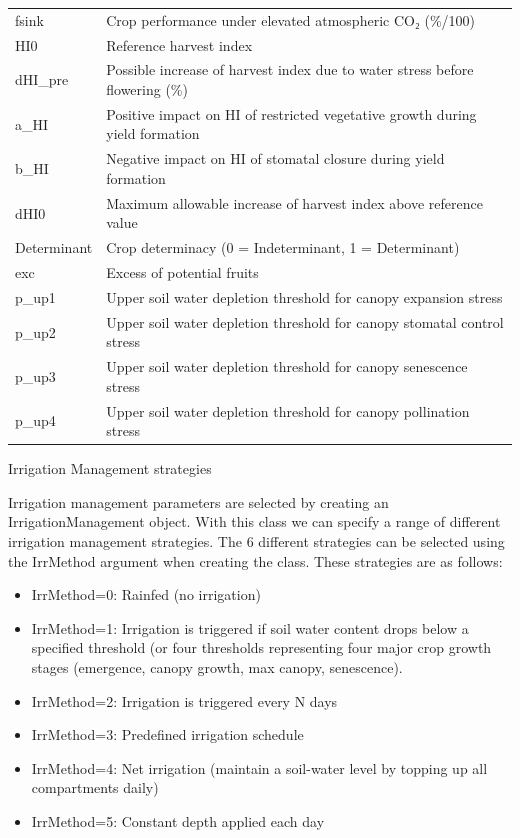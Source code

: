 \documentclass[
  letterpaper,
  DIV=11,
  numbers=noendperiod]{scrartcl}
\providecommand{\tightlist}{%
  \setlength{\itemsep}{0pt}\setlength{\parskip}{0pt}}\usepackage{longtable,booktabs,array}
\begin{document}
\begin{longtable}[]{@{}
  >{\raggedright\arraybackslash}p{}
  >{\raggedright\arraybackslash}p{}@{}}
fsink & Crop performance under elevated atmospheric CO₂ (\%/100) \\
HI0 & Reference harvest index \\
dHI\_pre & Possible increase of harvest index due to water stress before
flowering (\%) \\
a\_HI & Positive impact on HI of restricted vegetative growth during
yield formation \\
b\_HI & Negative impact on HI of stomatal closure during yield
formation \\
dHI0 & Maximum allowable increase of harvest index above reference
value \\
Determinant & Crop determinacy (0 = Indeterminant, 1 = Determinant) \\
exc & Excess of potential fruits \\
p\_up1 & Upper soil water depletion threshold for canopy expansion
stress \\
p\_up2 & Upper soil water depletion threshold for canopy stomatal
control stress \\
p\_up3 & Upper soil water depletion threshold for canopy senescence
stress \\
p\_up4 & Upper soil water depletion threshold for canopy pollination
stress \\
\end{longtable}

Irrigation Management strategies

Irrigation management parameters are selected by creating an
IrrigationManagement object. With this class we can specify a range of
different irrigation management strategies. The 6 different strategies
can be selected using the IrrMethod argument when creating the class.
These strategies are as follows:

\begin{itemize}
\tightlist
\item
  IrrMethod=0: Rainfed (no irrigation)
\item
  IrrMethod=1: Irrigation is triggered if soil water content drops below
  a specified threshold (or four thresholds representing four major crop
  growth stages (emergence, canopy growth, max canopy, senescence).
\item
  IrrMethod=2: Irrigation is triggered every N days
\item
  IrrMethod=3: Predefined irrigation schedule
\item
  IrrMethod=4: Net irrigation (maintain a soil-water level by topping up
  all compartments daily)
\item
  IrrMethod=5: Constant depth applied each day
\end{itemize}
\end{document}
